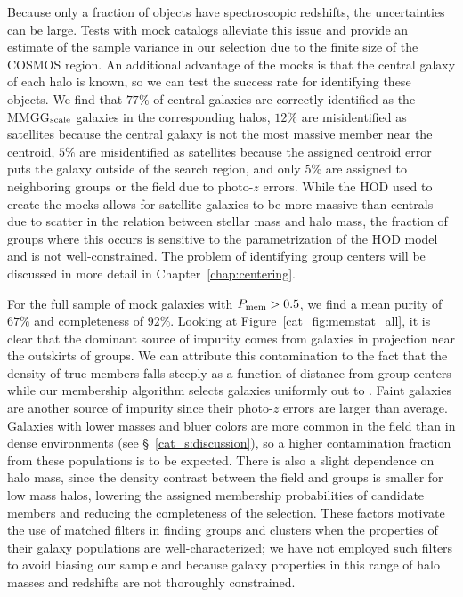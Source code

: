 Because only a fraction of objects have spectroscopic
redshifts, the uncertainties can be large. Tests with mock catalogs
alleviate this issue and provide an
estimate of the sample variance in our selection due to the finite
size of the COSMOS region. An additional advantage of the mocks is
that the central galaxy of  each halo is known, so we can test the
success rate for identifying these objects. We find that $77\%$ of
central galaxies are correctly identified as the MMGG$_{\rm scale}$
galaxies in the corresponding halos, $12\%$ are misidentified as
satellites because the central galaxy is not the most massive member
near the centroid, $5\%$ are misidentified as satellites because the
assigned centroid error puts the galaxy outside of the search region,
and only $5\%$ are assigned to neighboring groups or the field due to
photo-$z$ errors. While the HOD used to create the mocks allows for
satellite galaxies to be more massive than centrals due to scatter in
the relation between stellar mass and halo mass, the fraction of
groups where this occurs is sensitive to the parametrization of the
HOD model and is not well-constrained. The problem of identifying
group centers will be discussed in more detail in Chapter~\ref{chap:centering}.

For the full sample of mock galaxies with $P_{\rm mem}>0.5$, we find a
mean purity of $67\%$ and completeness of $92\%$. Looking at
Figure~\ref{cat_fig:memstat_all}, it is clear that the dominant source of
impurity comes from galaxies in projection near the outskirts of
groups. We can attribute this contamination to the fact that the
density of true members falls steeply as a function of distance from
group centers while our membership algorithm selects galaxies
uniformly out to \rvir. Faint galaxies are another source of impurity since their
photo-$z$ errors are larger than average. Galaxies with lower masses and
bluer colors are more common in the field than in dense environments
(see \S~\ref{cat_s:discussion}), so a higher contamination fraction from
these populations is to be expected. There is also a slight dependence on halo 
mass, since the density contrast between the field and groups is
smaller for low mass halos, lowering the assigned membership
probabilities of candidate members and reducing the completeness of
the selection. These factors motivate the use of matched filters in
finding groups and clusters when the properties of their galaxy
populations are well-characterized; we have not employed such filters
to avoid biasing our sample and because galaxy properties in this
range of halo masses and redshifts are not thoroughly constrained.


